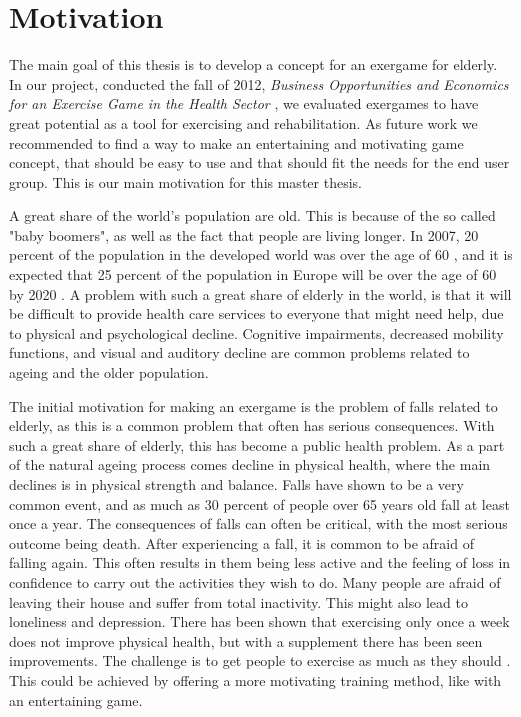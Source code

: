 \chapter{Motivation}
\label{chap:background}

The main goal of this thesis is to develop a concept for an exergame for elderly. In our project, conducted the fall of 2012, \emph{Business Opportunities and Economics for an Exercise Game in the Health Sector} \cite{project}, we evaluated exergames to have great potential as a tool for exercising and rehabilitation. As future work we recommended to find a way to make an entertaining and motivating game concept, that should be easy to use and that should fit the needs for the end user group. This is our main motivation for this master thesis. 

A great share of the world's population are old. This is because of the so called "baby boomers", as well as the fact that people are living longer. In 2007, 20 percent of the population in the developed world was over the age of 60 \cite{dickinson2007methods}, and it is expected that 25 percent of the population in Europe will be over the age of 60 by 2020 \cite{ijsselsteijn2007digital}. A problem with such a great share of elderly in the world, is that it will be difficult to provide health care services to everyone that might need help, due to physical and psychological decline. Cognitive impairments, decreased mobility functions, and visual and auditory decline are common problems related to ageing and the older population.

The initial motivation for making an exergame is the problem of falls related to elderly, as this is a common problem that often has serious consequences. With such a great share of elderly, this has become a public health problem. As a part of the natural ageing process comes decline in physical health, where the main declines is in physical strength and balance. Falls have shown to be a very common event, and as much as 30 percent of people over 65 years old fall at least once a year. The consequences of falls can often be critical, with the most serious outcome being death. After experiencing a fall, it is common to be afraid of falling again. This often results in them being less active and the feeling of loss in confidence to carry out the activities they wish to do. Many people are afraid of leaving their house and suffer from total inactivity. This might also lead to loneliness and depression. There has been shown that exercising only once a week does not improve physical health, but with a supplement there has been seen improvements. The challenge is to get people to exercise as much as they should \cite{project}. This could be achieved by offering a more motivating training method, like with an entertaining game.


